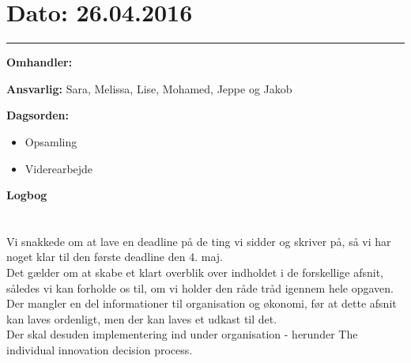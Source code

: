 \section{Dato: 26.04.2016}
\hrule

\textbf{Omhandler:}

\textbf{Ansvarlig:} Sara, Melissa, Lise, Mohamed, Jeppe og Jakob

\textbf{Dagsorden:}
\begin{itemize}
	\item Opsamling
	\item Viderearbejde
\end{itemize}

\textbf{Logbog}
\\
\\ \\
Vi snakkede om at lave en deadline på de ting vi sidder og skriver på, så vi har noget klar til den første deadline den 4. maj.\\
Det gælder om at skabe et klart overblik over indholdet i de forskellige afsnit, således vi kan forholde os til, om vi holder den råde tråd igennem hele opgaven.\\
Der mangler en del informationer til organisation og økonomi, før at dette afsnit kan laves ordenligt, men der kan laves et udkast til det.\\
Der skal desuden implementering ind under organisation - herunder The individual innovation decision process.\\



